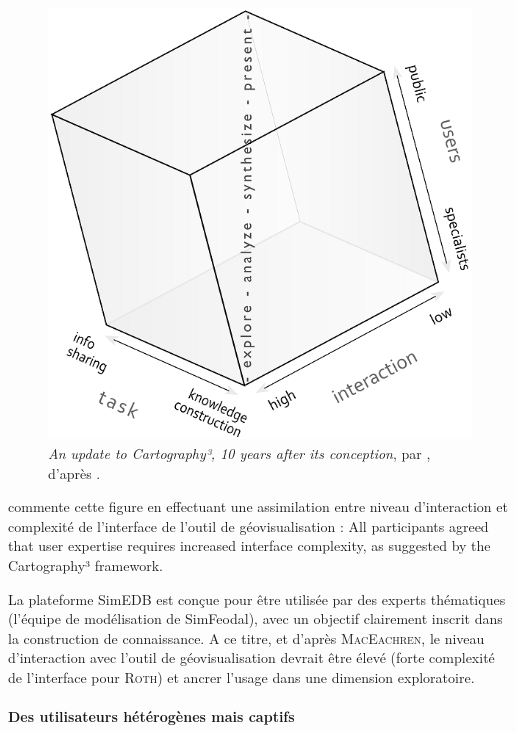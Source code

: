 \begin{figure}[H]
\centering
\vspace{0pt}
\includegraphics[width=.8\linewidth]{img/cartography3.png}
\captionsetup{width=.9\linewidth}
\caption{\og \textit{An update to Cartography³, 10 years after its conception}\fg{}, par \cite{coltekin_geovisualization_2018}, d'après \cite[10]{maceachren_geovisualization_2004}.}
\label{fig:cartography3}
\end{figure}

\textcite[16]{roth_interactivity_2015} commente cette figure en effectuant une assimilation entre niveau d'interaction et complexité de l'interface de l'outil de géovisualisation : \og All participants agreed that user expertise requires increased interface complexity, as suggested by the Cartography³ framework\fg{}.

La plateforme SimEDB est conçue pour être utilisée par des experts thématiques (l'équipe de modélisation de SimFeodal), avec un objectif clairement inscrit dans la construction de connaissance.
A ce titre, et d'après \textsc{MacEachren}, le niveau d'interaction avec l'outil de géovisualisation devrait être élevé (forte complexité de l'interface pour \textsc{Roth}) et ancrer l'usage dans une dimension exploratoire.



\paragraph*{Des utilisateurs hétérogènes mais captifs}

